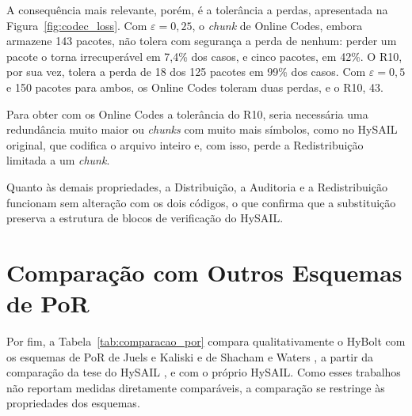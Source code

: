 A consequência mais relevante, porém, é a tolerância a perdas, apresentada na Figura~\ref{fig:codec_loss}. Com $\varepsilon = 0{,}25$, o \emph{chunk} de Online Codes, embora armazene 143 pacotes, não tolera com segurança a perda de nenhum: perder um pacote o torna irrecuperável em 7,4\% dos casos, e cinco pacotes, em 42\%. O R10, por sua vez, tolera a perda de 18 dos 125 pacotes em 99\% dos casos. Com $\varepsilon = 0{,}5$ e 150 pacotes para ambos, os Online Codes toleram duas perdas, e o R10, 43.

Para obter com os Online Codes a tolerância do R10, seria necessária uma redundância muito maior ou \emph{chunks} com muito mais símbolos, como no HySAIL original, que codifica o arquivo inteiro e, com isso, perde a Redistribuição limitada a um \emph{chunk}.

Quanto às demais propriedades, a Distribuição, a Auditoria e a Redistribuição funcionam sem alteração com os dois códigos, o que confirma que a substituição preserva a estrutura de blocos de verificação do HySAIL.

\section{Comparação com Outros Esquemas de PoR}
\label{sec:comparacao_por}

Por fim, a Tabela~\ref{tab:comparacao_por} compara qualitativamente o HyBolt com os esquemas de \acrshort{PoR} de Juels e Kaliski \cite{juels2007pors} e de Shacham e Waters \cite{shacham2008compact}, a partir da comparação da tese do HySAIL \cite{amaral2013hysail}, e com o próprio HySAIL. Como esses trabalhos não reportam medidas diretamente comparáveis, a comparação se restringe às propriedades dos esquemas.

